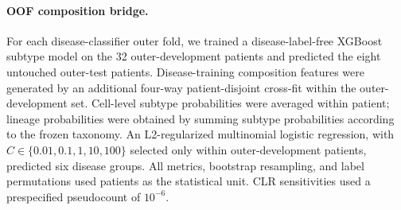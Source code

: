 \paragraph{OOF composition bridge.} For each disease-classifier outer fold, we trained a disease-label-free XGBoost subtype model on the 32 outer-development patients and predicted the eight untouched outer-test patients. Disease-training composition features were generated by an additional four-way patient-disjoint cross-fit within the outer-development set. Cell-level subtype probabilities were averaged within patient; lineage probabilities were obtained by summing subtype probabilities according to the frozen taxonomy. An L2-regularized multinomial logistic regression, with $C\in\{0.01,0.1,1,10,100\}$ selected only within outer-development patients, predicted six disease groups. All metrics, bootstrap resampling, and label permutations used patients as the statistical unit. CLR sensitivities used a prespecified pseudocount of $10^{-6}$.
